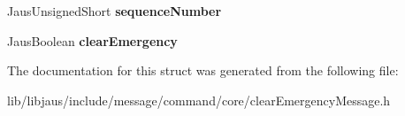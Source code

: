 \begin{DoxyCompactItemize}
\item 
\hypertarget{struct_clear_emergency_message_struct_ae8d05a3b325c0b563e9766fb92d5a7e8}{\-Jaus\-Unsigned\-Short {\bfseries sequence\-Number}}\label{struct_clear_emergency_message_struct_ae8d05a3b325c0b563e9766fb92d5a7e8}

\item 
\hypertarget{struct_clear_emergency_message_struct_ac7f7a34ab72e8b6dbd2032a86efe8605}{\-Jaus\-Boolean {\bfseries clear\-Emergency}}\label{struct_clear_emergency_message_struct_ac7f7a34ab72e8b6dbd2032a86efe8605}

\end{DoxyCompactItemize}


\-The documentation for this struct was generated from the following file\-:\begin{DoxyCompactItemize}
\item 
lib/libjaus/include/message/command/core/clear\-Emergency\-Message.\-h\end{DoxyCompactItemize}
